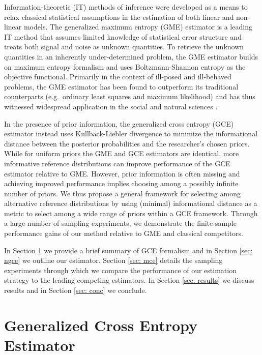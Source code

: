 \documentclass{elsarticle}
\begin{document}
Information-theoretic (IT) methods of inference were developed as a means to
relax classical statistical assumptions in the estimation of both linear and 
non-linear models.
The generalized maximum entropy (GME) estimator is a leading IT method 
that assumes limited knowledge of statistical error structure and treats both
signal and noise as unknown quantities.
To retrieve the unknown quantities in an inherently under-determined problem, 
the GME estimator builds on maximum entropy formalism \citep{jaynes1957a} 
and uses Boltzmann-Shannon entropy \citep{shannon1948} as the objective 
functional.
Primarily in the context of ill-posed and ill-behaved problems, the GME 
estimator has been found to outperform its traditional counterparts 
(e.g.\ ordinary least squares and maximum likelihood) and has thus
witnessed widespread application in the social and natural sciences 
\citep{golan1996}. 

In the presence of prior information, the generalized cross entropy (GCE) 
estimator instead uses Kullback-Liebler divergence \citep{kullback1951} 
to minimize the informational distance between the posterior probabilities 
and the researcher's chosen priors.
While for uniform priors the GME and GCE estimators are identical,  
more informative reference distributions can improve performance of the 
GCE estimator relative to GME. 
However, prior information is often missing and achieving improved 
performance implies choosing among a possibly infinite number of priors.
We thus propose a general framework for selecting among alternative 
reference distributions by using (minimal) informational distance as a metric 
to select among a wide range of priors within a GCE framework.
Through a large number of sampling experiments, we demonstrate the 
finite-sample performance gains of our method relative to GME and 
classical competitors.

In Section \ref{sec: gce} we provide a brief summary of GCE formalism and 
in Section \ref{sec: ngce} we outline our estimator. 
Section \ref{sec: mce} details the sampling experiments through which we 
compare the performance of our estimation strategy to the leading competing 
estimators. 
In Section \ref{sec: results} we discuss results and in Section \ref{sec: conc} 
we conclude. 


\section{Generalized Cross Entropy Estimator}
\label{sec: gce}
\end{document}
